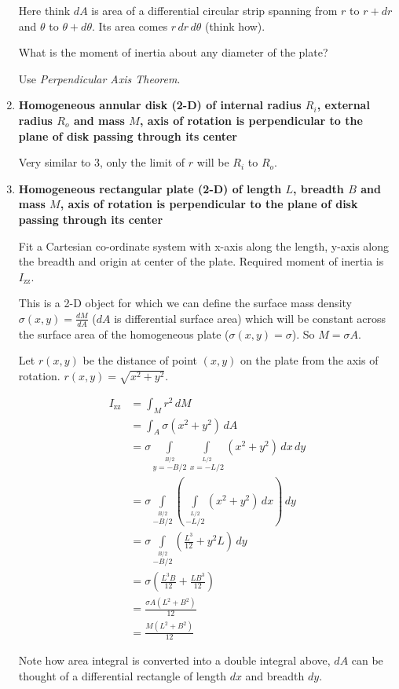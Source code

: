 \documentclass[a4paper,10pt]{article}
\begin{document}
\begin{enumerate}
Here think $dA$ is area of a differential circular strip spanning from $r$ to $r+dr$ and $\theta$ to $\theta+d\theta$. Its area comes $r\,dr\,d\theta$ (think how).

What is the moment of inertia about any diameter of the plate? 

Use \emph{Perpendicular Axis Theorem}.

\item \textbf{Homogeneous annular disk (2-D) of internal radius $R_i$, external radius $R_o$ and mass $M$, axis of rotation is perpendicular to the plane of disk passing through its center}

Very similar to 3, only the limit of $r$ will be $R_i$ to $R_o$.

\item \textbf{Homogeneous rectangular plate (2-D) of length $L$, breadth $B$ and mass $M$, axis of rotation is perpendicular to the plane of disk passing through its center}

Fit a Cartesian co-ordinate system with x-axis along the length, y-axis along the breadth and origin at center of the plate. Required moment of inertia is $I_{\text{zz}}$.

This is a 2-D object for which we can define the surface mass density $\sigma(x, y) = \frac{dM}{dA}$ ($dA$ is differential surface area) which will be constant across the surface area of the homogeneous plate ($\sigma(x, y) = \sigma$). So $M = \sigma A$.

Let $r(x, y)$ be the distance of point $(x, y)$ on the plate from the axis of rotation. $r(x, y) = \sqrt{x^2+y^2}$.

\begin{align*}
I_\text{zz} &= \int_M r^2 \,dM\\
&= \int_A \sigma (x^2+y^2) \,dA\\
&= \sigma\int\limits_{y=-B/2}\limits^{B/2}
\int\limits_{x=-L/2}\limits^{L/2}(x^2+y^2) \,dx\,dy\\
&= \sigma\int\limits_{-B/2}\limits^{B/2}
\left(\int\limits_{-L/2}\limits^{L/2} (x^2+y^2) \,dx\right)\,dy\\
&= \sigma\int\limits_{-B/2}\limits^{B/2}
\left(\frac{L^3}{12}+y^2L\right)\,dy\\
&= \sigma \left(\frac{L^3B}{12}+\frac{LB^3}{12}\right)\\
&= \frac{\sigma A(L^2+B^2)}{12}\\
&= \frac{M(L^2+B^2)}{12}
\end{align*}

Note how area integral is converted into a double integral above, $dA$ can be thought of a differential rectangle of length $dx$ and breadth $dy$.


\end{enumerate}
\end{document}
